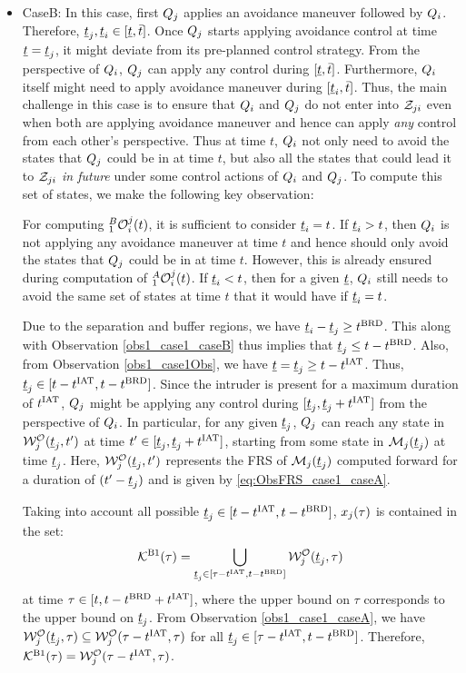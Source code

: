\begin{itemize}[leftmargin=*]
\item \label{sec:intruderObs_case1_caseB} CaseB: In this case, first $Q_j$ applies an avoidance maneuver followed by $Q_i$. Therefore, $\underline{t}_j, \underline{t}_i \in [\underline{t}, \bar{t}]$. Once $Q_j$ starts applying avoidance control at time $\underline{t} = \underline{t}_j$, it might deviate from its pre-planned control strategy. From the perspective of $Q_i$, $Q_j$ can apply any control during $[\underline{t}, \bar{t}]$. Furthermore, $Q_i$ itself might need to apply avoidance maneuver during $[\underline{t}_i, \bar{t}]$. Thus, the main challenge in this case is to ensure that $Q_i$ and $Q_j$ do not enter into $\mathcal{Z}_{ji}$ even when both are applying avoidance maneuver and hence can apply \textit{any} control from each other's perspective. Thus at time $t$, $Q_i$ not only need to avoid the states that $Q_j$ could be in at time $t$, but also all the states that could lead it to $\mathcal{Z}_{ji}$ \textit{in future} under some control actions of $Q_i$ and $Q_j$. To compute this set of states, we make the following key observation:
\begin{observation} \label{obs1_case1_caseB}
For computing $_1^B\mathcal{O}_i^j(t)$, it is sufficient to consider $\underline{t}_i = t$. If $\underline{t}_i > t$, then $Q_i$ is not applying any avoidance maneuver at time $t$ and hence should only avoid the states that $Q_j$ could be in at time $t$. However, this is already ensured during computation of $_1^A\mathcal{O}_i^j(t)$. If $\underline{t}_i < t$, then for a given $\underline{t}$, $Q_i$ still needs to avoid the same set of states at time $t$ that it would have if $\underline{t}_i = t$.  
\end{observation}

Due to the separation and buffer regions, we have $\underline{t}_i - \underline{t}_j \geq t^\text{BRD}$. This along with Observation \ref{obs1_case1_caseB} thus implies that $\underline{t}_j \leq t - t^\text{BRD}$. Also, from Observation \ref{obs1_case1Obs}, we have $\underline{t} = \underline{t}_j \geq t-t^\text{IAT}$. Thus, $\underline{t}_j \in [t-t^\text{IAT}, t-t^\text{BRD}]$. Since the intruder is present for a maximum duration of $t^\text{IAT}$, $Q_j$ might be applying any control during $[\underline{t}_j, \underline{t}_j + t^\text{IAT}]$ from the perspective of $Q_i$. In particular, for any given $\underline{t}_j$, $Q_j$ can reach any state in $\mathcal{W}_{j}^{\mathcal{O}}(\underline{t}_j, t')$ at time $t' \in [\underline{t}_j, \underline{t}_j+t^\text{IAT}]$, starting from some state in $\mathcal{M}_j(\underline{t}_j)$ at time $\underline{t}_j$. Here, $\mathcal{W}_{j}^{\mathcal{O}}(\underline{t}_j, t')$ represents the FRS of $\mathcal{M}_j(\underline{t}_j)$ computed forward for a duration of $(t' - \underline{t}_j)$ and is given by \eqref{eq:ObsFRS_case1_caseA}. 

Taking into account all possible $\underline{t}_j \in [t-t^\text{IAT}, t-t^\text{BRD}]$, $x_j(\tau)$ is contained in the set:
\begin{equation}
\mathcal{K}^{\text{B1}}(\tau) = \bigcup_{\underline{t}_j \in [\tau-t^\text{IAT}, t-t^\text{BRD}]} \mathcal{W}_{j}^{\mathcal{O}}(\underline{t}_j, \tau)
\end{equation} 
at time $\tau \in [t, t-t^\text{BRD}+t^\text{IAT}]$, where the upper bound on $\tau$ corresponds to the upper bound on $\underline{t}_j$. From Observation \ref{obs1_case1_caseA}, we have $\mathcal{W}_{j}^{\mathcal{O}}(\underline{t}_j, \tau) \subseteq \mathcal{W}_{j}^{\mathcal{O}}(\tau-t^\text{IAT}, \tau)$ for all $\underline{t}_j \in [\tau-t^\text{IAT}, t-t^\text{BRD}]$. Therefore, $\mathcal{K}^{\text{B1}}(\tau) = \mathcal{W}_{j}^{\mathcal{O}}(\tau-t^\text{IAT}, \tau)$.


\end{itemize}
